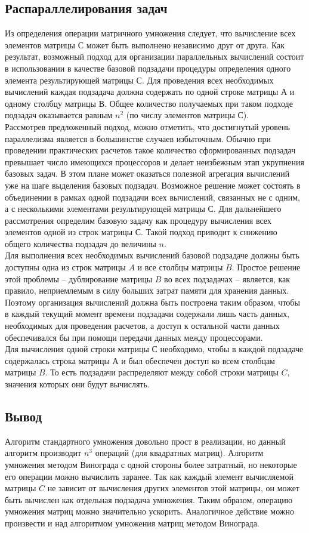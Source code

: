 \documentclass[a4paper,12pt]{article}
\begin{document}
\subsection{Распараллелирования задач}
Из определения операции матричного умножения следует, что вычисление всех элементов матрицы $С$ может быть выполнено независимо друг от друга. Как результат, возможный подход для организации параллельных вычислений состоит в использовании в качестве базовой подзадачи процедуры определения одного элемента результирующей матрицы $С$. Для проведения всех необходимых вычислений каждая подзадача должна содержать по одной строке матрицы $А$ и одному столбцу матрицы $В$. Общее количество получаемых при таком подходе подзадач оказывается равным $n^2$ (по числу элементов матрицы $С$).
\\
Рассмотрев предложенный подход, можно отметить, что достигнутый уровень параллелизма является в большинстве случаев избыточным. Обычно при проведении практических расчетов такое количество сформированных подзадач превышает число имеющихся процессоров и делает неизбежным этап укрупнения базовых задач. В этом плане может оказаться полезной агрегация вычислений уже на шаге выделения базовых подзадач. Возможное решение может состоять в объединении в рамках одной подзадачи всех вычислений, связанных не с одним, а с несколькими элементами результирующей матрицы $С$. Для дальнейшего рассмотрения определим базовую задачу как процедуру вычисления всех элементов одной из строк матрицы $С$. Такой подход приводит к снижению общего количества подзадач до величины $n$.
\\
Для выполнения всех необходимых вычислений базовой подзадаче должны быть доступны одна из строк матрицы $A$ и все столбцы матрицы $B$. Простое решение этой проблемы – дублирование матрицы $B$ во всех подзадачах – является, как правило, неприемлемым в силу больших затрат памяти для хранения данных. Поэтому организация вычислений должна быть построена таким образом, чтобы в каждый текущий момент времени подзадачи содержали лишь часть данных, необходимых для проведения расчетов, а доступ к остальной части данных обеспечивался бы при помощи передачи данных между процессорами. 
\\
Для вычисления одной строки матрицы $С$ необходимо, чтобы в каждой подзадаче содержалась строка матрицы $А$ и был обеспечен доступ ко всем столбцам матрицы $B$. То есть подзадачи распределяют между собой строки матрицы $C$, значения которых они будут вычислять\cite{McConnell}.

\newpage
\subsection{Вывод}
Алгоритм стандартного умножения довольно прост в реализации, но данный алгоритм производит $n^3$ операций (для квадратных матриц). Алгоритм умножения методом Винограда с одной стороны более затратный, но некоторые его операции можно вычислить заранее. Так как каждый элемент вычисляемой матрицы $C$ не зависит от вычисления других элементов этой матрицы, он может быть вычислен как отдельная подзадача умножения. Таким образом, операцию умножения матриц можно значительно ускорить. Аналогичное действие можно произвести и над алгоритмом умножения матриц методом Винограда.  
\end{document}
